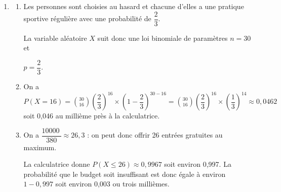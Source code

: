 \documentclass[10pt]{article}
\providecommand{\np}[2][]{{#2~#1}}
\begin{document}
\medskip



\begin{enumerate}[resume]
\item 
	

	

	\begin{enumerate}
		\item 
Les personnes sont choisies au hasard et chacune d'elles a une pratique sportive régulière avec une probabilité de $\dfrac23$.

La variable aléatoire $X$ suit donc une loi binomiale de paramètres $n = 30$ et 

$p = \dfrac23$.
		\item 
		On a $P(X = 16) = \displaystyle\binom{30}{16} \left(\dfrac23\right)^{16}\times \left(1 - \dfrac23\right)^{30 - 16} = \displaystyle\binom{30}{16} \left(\dfrac23\right)^{16}\times \left(\dfrac13\right)^{14} \approx 0,0462$ soit 0,046 au millième près à la calculatrice.
		\item 
		

		

On a $\dfrac{\np{10000}}{380}\approx 26,3$ : on peut donc offrir 26 entrées gratuites au maximum.

La calculatrice donne $P(X \leqslant 26) \approx 0,9967$ soit environ 0,997.
La probabilité que le budget soit insuffisant est donc égale à environ $1 - 0,997$ soit environ 0,003 ou trois millièmes.
	\end{enumerate}
\end{enumerate}

\bigskip
\end{document}
